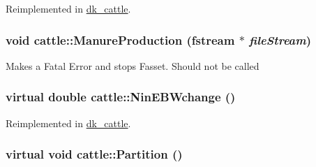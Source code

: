 Reimplemented in \hyperlink{classdk__cattle_a015a7a7fd47f94af868165d276d26142}{dk\_\-cattle}.\hypertarget{classcattle_abbfa3e590fcb00ff39222a765f8cf608}{
\subsubsection[{ManureProduction}]{\setlength{\rightskip}{0pt plus 5cm}void cattle::ManureProduction (fstream $\ast$ {\em fileStream})}}
\label{classcattle_abbfa3e590fcb00ff39222a765f8cf608}
Makes a Fatal Error and stops Fasset. Should not be called \hypertarget{classcattle_adc0149dd773e4a12265c5e144eef6064}{
\subsubsection[{NinEBWchange}]{\setlength{\rightskip}{0pt plus 5cm}virtual double cattle::NinEBWchange ()}}
\label{classcattle_adc0149dd773e4a12265c5e144eef6064}


Reimplemented in \hyperlink{classdk__cattle_a15d4305d06c0046414ba06a00904c0b9}{dk\_\-cattle}.\hypertarget{classcattle_af6ad25c3e883a183b1470d6b7e534406}{
\subsubsection[{Partition}]{\setlength{\rightskip}{0pt plus 5cm}virtual void cattle::Partition ()}}
\label{classcattle_af6ad25c3e883a183b1470d6b7e534406}


